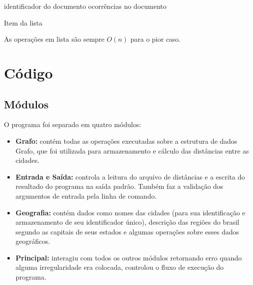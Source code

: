 \documentclass[12pt]{article}
\begin{document}
\begin{algorithm}[h!]
\begin{footnotesize}
	identificador do documento\;
	ocorrências no documento\;
\caption{Item da lista}
\end{footnotesize}
\end{algorithm}

As operações em lista são sempre $O(n)$ para o pior caso.

\section{Código}

\subsection{Módulos}
O programa foi separado em quatro módulos:
\begin{itemize}
\item \textbf{Grafo:} contém todas as operações executadas sobre a 
estrutura de dados Grafo, que foi utilizada para armazenamento e cálculo
das distâncias entre as cidades.
\item \textbf{Entrada e Saída:} controla a leitura do arquivo de distâncias
e a escrita do resultado do programa na saída padrão. Também faz a validação dos 
argumentos de entrada pela linha de comando.
\item \textbf{Geografia:} contém dados como nomes das cidades (para sua identificação
e armazenamento de seu identificador único), descrição das regiões do brasil
segundo as capitais de seus estados e algumas operações sobre esses dados geográficos.
\item \textbf{Principal:} interagiu com todos os outros módulos retornando erro
quando alguma irregularidade era colocada, controlou o fluxo de execução do
programa.
\end{itemize}
\end{document}
